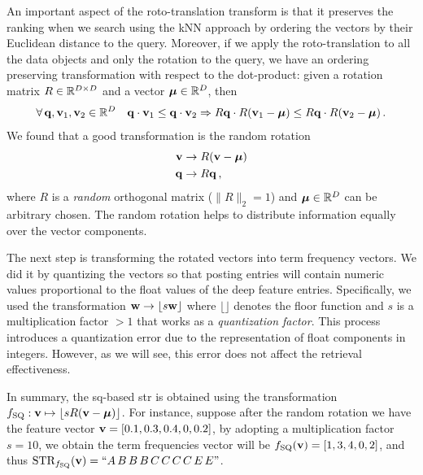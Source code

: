 An important aspect of the roto-translation transform is that it preserves the ranking when we search using the kNN approach by ordering the vectors by their Euclidean distance to the query.
Moreover, if we apply the roto-translation to all the data objects and only the rotation to the query, we have an ordering preserving transformation with respect to the dot-product:
given a rotation matrix $R \in \mathbb{R}^{{D} \times {D}}$ and a vector $\boldsymbol {\mu} \in \mathbb{R}^{{D}}$, then
\begin{equation}
\forall\, \mathbf{q}, \mathbf{v}_1, \mathbf{v}_2 \in \mathbb{R}^{{D}} \quad    \mathbf{q} \cdot \mathbf{v}_1 \leq \mathbf{q} \cdot \mathbf{v}_2 \Rightarrow R\mathbf{q}\cdot R(\mathbf{v}_1 - \boldsymbol {\mu}) \leq R\mathbf{q}\cdot R(\mathbf{v}_2 - \boldsymbol {\mu}) \,.
\end{equation}
We found that a good transformation is the random rotation
\begin{equation}
\begin{split}
\mathbf{v} &\to R(\mathbf{v} - \boldsymbol {\mu}) \\
\mathbf{q} &\to R \mathbf{q} \,,
\end{split}
\end{equation}
where $R$ is a \emph{random} orthogonal matrix ($\|R\|_2 = 1$) and $\boldsymbol {\mu} \in \mathbb{R}^{{D}}$ can be arbitrary chosen.
The random rotation helps to distribute information equally over the vector components.

The next step is transforming the rotated vectors into term frequency vectors.
We did it by quantizing the vectors so that posting entries will contain numeric values proportional to the float values of the deep feature entries.
Specifically, we used the transformation $\mathbf{w} \to \lfloor s\mathbf{w} \rfloor$ where $\lfloor \rfloor$ denotes the floor function and $s$ is a multiplication factor $> 1$ that works as a \emph{quantization factor}.
This process introduces a quantization error due to the representation of float components in integers.
However, as we will see, this error does not affect the retrieval effectiveness.

In summary, the \gls{sq}-based \gls{str} is obtained using the transformation
$
f_\text{SQ} : \mathbf{v} \mapsto \lfloor s R(\mathbf{v} -\boldsymbol {\mu})\rfloor
$.
For instance, suppose after the random rotation we have the feature vector $\mathbf{v} = [0.1, 0.3, 0.4, 0, 0.2]$, by adopting a multiplication factor $s = 10$, we obtain the term frequencies vector will be $f_\text{SQ}(\mathbf{v}) = [1, 3, 4, 0, 2]$, and thus $\text{STR}_{f_\text{SQ}}(\mathbf{v})=``A\, B\, B\, B \, C \, C\, C\, C\, E\, E"$.

